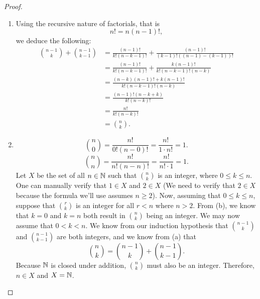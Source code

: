 \begin{proof}
\begin{enumerate}[label=(\alph*)]
\item Using the recursive nature of factorials, that is \[n! = n(n-1)!,\] we deduce the following:
\begin{align*}
    \binom{n-1}{k} + \binom{n-1}{k-1} &= \frac{(n-1)!}{k!(n-k-1)!} + \frac{(n-1)!}{(k-1)!((n-1)-(k-1))!} \\
    &= \frac{(n-1)!}{k!(n-k-1)!} + \frac{k(n-1)!}{k!(n-k-1)!(n-k)} \\
    &= \frac{(n-k)(n-1)! + k(n-1)!}{k!(n-k-1)!(n-k)} \\
    &= \frac{(n-1)!(n-k+k)}{k!(n-k)!} \\
    &= \frac{n!}{k!(n-k)!} \\
    &= \binom{n}{k}.
\end{align*}

\item \[\binom{n}{0} = \frac{n!}{0!(n-0)!} = \frac{n!}{1\cdot n!} = 1.\]
\[\binom{n}{n} = \frac{n!}{n!(n-n)!} = \frac{n!}{n! \cdot 1} = 1.\]
Let \(X\) be the set of all \(n \in \mathbb{N}\) such that \(\binom{n}{k}\) is an integer, where \(0 \leq k \leq n\).
One can manually verify that \(1 \in X\) and \(2 \in X\) (We need to verify that \(2 \in X\) because the formula we'll use assumes \(n \geq 2\)). Now, assuming that \(0 \leq k \leq n\),
suppose that \(\binom{r}{k}\) is an integer for all \(r < n\) where \(n > 2\). From (b), we know that \(k = 0\) and \(k = n\) both result in \(\binom{n}{k}\) being an integer.
We may now assume that \(0 < k < n\). We know from our induction hypothesis that \(\binom{n-1}{k}\) and \(\binom{n-1}{k-1}\) are both integers, and we know from (a)
that \[\binom{n}{k} = \binom{n-1}{k} + \binom{n-1}{k-1}.\]
Because \(\mathbb{N}\) is closed under addition, \(\binom{n}{k}\) must also be an integer. Therefore, \(n \in X\) and \(X = \mathbb{N}\).


\end{enumerate}
\end{proof}
